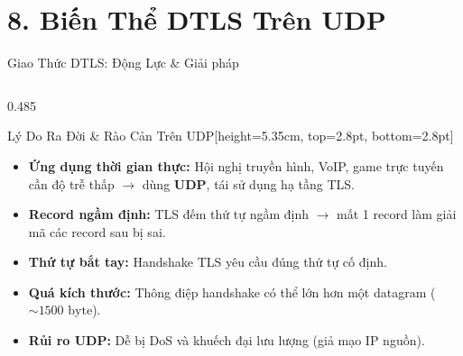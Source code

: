 \documentclass[aspectratio=169, 10pt]{beamer}
\begin{document}
\section{8. Biến Thể DTLS Trên UDP}

\begin{frame}{Giao Thức DTLS: Động Lực \& Giải pháp}
	\begin{columns}[T]
		\begin{column}{0.485\textwidth}
			\begin{accentcard}[uetblue]{Lý Do Ra Đời \& Rào Cản Trên UDP}[height=5.35cm, top=2.8pt, bottom=2.8pt]
				\raggedright
				\setlength{\leftmargini}{9pt}
				\begin{itemize}\setlength{\itemsep}{3.8pt}\setlength{\topsep}{0pt}\fontsize{6.2pt}{7.8pt}\selectfont
					\item \textbf{Ứng dụng thời gian thực:} Hội nghị truyền hình, VoIP, game trực tuyến cần độ trễ thấp $\rightarrow$ dùng \textbf{UDP}, tái sử dụng hạ tầng TLS.
					\item \textbf{Record ngầm định:} TLS đếm thứ tự ngầm định $\rightarrow$ mất 1 record làm giải mã các record sau bị sai.
					\item \textbf{Thứ tự bắt tay:} Handshake TLS yêu cầu đúng thứ tự cố định.
					\item \textbf{Quá kích thước:} Thông điệp handshake có thể lớn hơn một datagram ($\sim 1500\text{ byte}$).
					\item \textbf{Rủi ro UDP:} Dễ bị DoS và khuếch đại lưu lượng (giả mạo IP nguồn).
				\end{itemize}
			\end{accentcard}
		\end{column}


\end{columns}
\end{frame}
\end{document}
